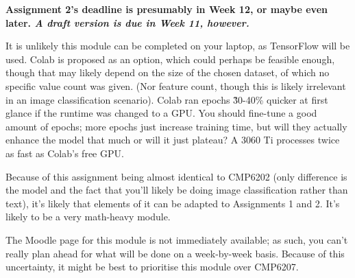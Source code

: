 \documentclass[12pt]{report}
\newcommand{\para}{\vspace{7pt}\noindent}
\begin{document}
\para \textbf{Assignment 2's deadline is presumably in Week 12, or maybe even later. 
\textit{A draft version is due in Week 11, however.} } 

\para It is unlikely this module can be completed on your laptop, as TensorFlow 
will be used. Colab is proposed as an option, which could perhaps be feasible enough, though 
that may likely depend on the size of the chosen dataset, of which no specific value 
count was given. (Nor feature count, though this is likely irrelevant in an image classification scenario).
Colab ran epochs \~30-40\% quicker at first glance if the runtime was changed to a GPU.
You should fine-tune a good amount of epochs; more epochs just increase training time, but will they actually 
enhance the model that much or will it just plateau? A 3060 Ti processes twice as fast as Colab's free GPU.

\para Because of this assignment being almost identical to CMP6202 (only difference is the model and 
the fact that you'll likely be doing image classification rather than text),
it's likely that elements of it can be adapted to Assignments 1 and 2. It's likely to be a very math-heavy 
module.

\para The Moodle page for this module is not immediately available; as such, you can't really plan ahead 
for what will be done on a week-by-week basis. Because of this uncertainty, it might be best to prioritise 
this module over CMP6207.
\end{document}
